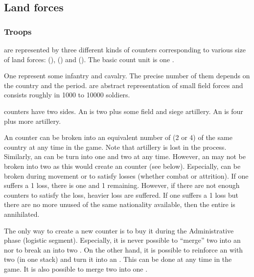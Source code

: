 \subsection{Land forces}


\subsubsection{Troops}\label{chLogistic:Troops definition}
\aparag[Troops] are represented by three different kinds of counters
corresponding to various size of land forces:  (\ARMY),
 (\LD) and 
(\LDE).
\bparag The basic count unit is one \LD.

\aparag[Detachments.] One \LD represent some infantry and cavalry. The precise
number of them depends on the country and the period. \LD are abstract
representation of small field forces and consists roughly in 1000 to 10000
soldiers.

\aparag[Armies.] \ARMY counters have two sides. An \ARMY\facemoins is two \LD
plus some field and siege artillery. An \ARMY\faceplus is four \LD plus more
artillery.

 An \ARMY counter can be broken into an equivalent
number of \LD (2 or 4) of the same country at any time in the game. Note that
artillery is lost in the process.
\bparag Similarly, an \ARMY\faceplus can be turn into one \ARMY\facemoins and
two \LD at any time.
\bparag However, an \ARMY\faceplus may not be broken into two
\ARMY\facemoins as this would create an \ARMY counter (see below).
\bparag Especially, \ARMY can be broken during movement or to satisfy losses
(whether combat or attrition). If one \ARMY\faceplus suffers a 1 \LD loss,
there is one \ARMY\facemoins and 1 \LD remaining.
\bparag However, if there are not enough \LD counters to satisfy the loss,
heavier loss are suffered. If one \ARMY\facemoins suffers a 1 \LD loss but
there are no more unused \LD of the same nationality available, then the
entire \ARMY\facemoins is annihilated.

 The only way to create a new \ARMY
counter is to buy it during the Administrative phase (logistic segment).
\bparag Especially, it is never possible to ``merge'' two \LD into an
\ARMY\facemoins nor to break an \ARMY\faceplus into two \ARMY\facemoins.
\bparag On the other hand, it is possible to reinforce an \ARMY\facemoins with
two \LD (in one stack) and turn it into an \ARMY\faceplus. This can be done at
any time in the game.
\bparag It is also possible to merge two \ARMY\facemoins into one
\ARMY\faceplus.

